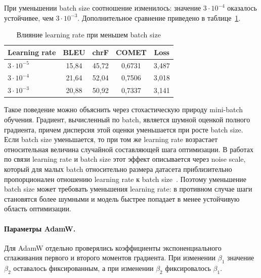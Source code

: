 При уменьшении batch size соотношение изменилось: значение $3 \cdot 10^{-4}$ оказалось устойчивее, чем $3 \cdot 10^{-3}$. Дополнительное сравнение приведено в таблице~\ref{tab:lr-small-batch-comparison}.

\begin{table}[H]
	\centering
	\caption{Влияние learning rate при меньшем batch size}
	\label{tab:lr-small-batch-comparison}
	\begin{tabular}{|p{}|c|c|c|c|}
		\hline
		\textbf{Learning rate} & \textbf{BLEU} & \textbf{chrF} & \textbf{COMET} & \textbf{Loss} \\
		\hline
		$3 \cdot 10^{-5}$      & 15{,}84       & 45{,}72       & 0{,}6731       & 3{,}487       \\
		\hline
		$3 \cdot 10^{-4}$      & 21{,}64       & 52{,}04       & 0{,}7506       & 3{,}018       \\
		\hline
		$3 \cdot 10^{-3}$      & 20{,}88       & 50{,}92       & 0{,}7337       & 3{,}141       \\
		\hline
	\end{tabular}
\end{table}

Такое поведение можно объяснить через стохастическую природу mini-batch обучения. Градиент, вычисленный по batch, является шумной оценкой полного градиента, причем дисперсия этой оценки уменьшается при росте batch size. Если batch size уменьшается, то при том же learning rate возрастает относительная величина случайной составляющей шага оптимизации. В работах по связи learning rate и batch size этот эффект описывается через noise scale, который для малых batch относительно размера датасета приблизительно пропорционален отношению learning rate к batch size~\cite{batch_size_lr}. Поэтому уменьшение batch size может требовать уменьшения learning rate: в противном случае шаги становятся более шумными и модель быстрее попадает в менее устойчивую область оптимизации.

\paragraph{Параметры AdamW.}
Для AdamW отдельно проверялись коэффициенты экспоненциального сглаживания первого и второго моментов градиента. При изменении $\beta_1$ значение $\beta_2$ оставалось фиксированным, а при изменении $\beta_2$ фиксировалось $\beta_1$.

